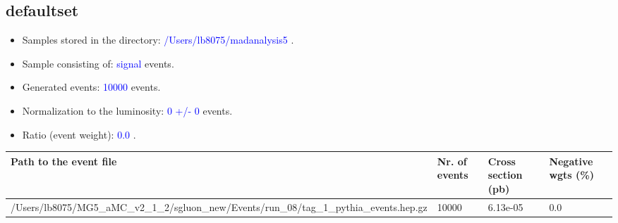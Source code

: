 \documentclass[a4paper, 11pt]{article}
\begin{document}
\subsection{ defaultset}

\begin{itemize}
  \item Samples stored in the directory: \textcolor{blue}{/\-Users/\-lb8075/\-madanalysis5} .
   \item Sample consisting of: \textcolor{blue}{signal}  events.
   \item Generated events: \textcolor{blue}{10000 }  events.
   \item Normalization to the luminosity: \textcolor{blue}{0}\textcolor{blue}{ +/\-- }\textcolor{blue}{0 }  events.
   \item Ratio (event weight): \textcolor{blue}{0.0 } .  
 
\end{itemize}
\begin{table}[!h]
  \begin{center}
    \begin{tabular}{|m{51.0mm}|m{24.0mm}|m{28.0mm}|m{28.0mm}|}
      \hline
      \cellcolor{yellow}         Path to the event file& \cellcolor{yellow}         Nr. of events& \cellcolor{yellow}         Cross section (pb)& \cellcolor{yellow}         Negative wgts (\%)\\
      \hline
      \cellcolor{white}          /\-Users/\-lb8075/\-MG5\_aMC\_v2\_1\_2/\-sgluon\_new/\-Events/\-run\_08/\-tag\_1\_pythia\_events.hep.gz& \cellcolor{white}          10000& \cellcolor{white}          6.13e-05& \cellcolor{white}          0.0\\
\hline
    \end{tabular}
  \end{center}
\end{table}
\end{document}
